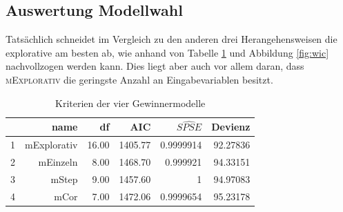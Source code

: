 \subsection{Auswertung Modellwahl}
Tats\"achlich schneidet im Vergleich zu den anderen drei Herangehensweisen die explorative am besten ab, wie anhand von Tabelle \ref{tab:wic} und Abbildung \ref{fig:wic} nachvollzogen werden kann.
Dies liegt aber auch vor allem daran, dass \textsc{mExplorativ} die geringste Anzahl an Eingabevariablen besitzt.

\begin{table}[ht]
\centering
\begin{tabular}{rrrrrr}
  \hline
  & name & df & AIC & $\hat{SPSE}$ & Devienz  \\ 
  \hline
	1 & mExplorativ & 16.00 & 1405.77 & 0.9999914 & 92.27836 \\ 
	2 & mEinzeln & 8.00 & 1468.70 &  0.999921 & 94.33151\\   
  	3 & mStep & 9.00 & 1457.60 &  1 & 94.97083\\ 
    4 & mCor & 7.00 & 1472.06 &  0.9999654 & 95.23178\\ 
   \hline
\end{tabular}
\caption{Kriterien der vier Gewinnermodelle}
\label{tab:wic}
\end{table}

